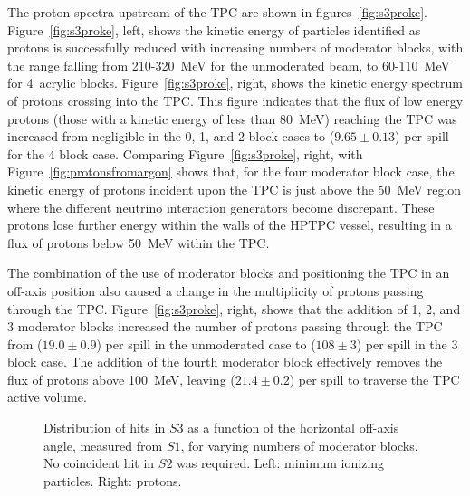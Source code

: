 The proton spectra upstream of the TPC are shown in figures~\ref{fig:s3proke}.
Figure~\ref{fig:s3proke}, left, shows the kinetic energy of particles identified as protons is successfully reduced with increasing numbers of moderator blocks, with the range falling from 210-320~MeV for the unmoderated beam, to 60-110~MeV for 4~acrylic blocks.
Figure~\ref{fig:s3proke}, right, shows the kinetic energy spectrum of protons crossing into the TPC.
This figure indicates that the flux of low energy protons (those with a kinetic energy of less than 80~MeV) reaching the TPC was increased from negligible in the 0, 1, and 2 block cases to ($9.65 \pm 0.13$) per spill for the 4 block case.
Comparing Figure~\ref{fig:s3proke}, right, with Figure~\ref{fig:protonsfromargon} shows that, for the four moderator block case, the kinetic energy of protons incident upon the TPC is just above the 50~MeV region where the different neutrino interaction generators become discrepant.
These protons lose further energy within the walls of the HPTPC vessel, resulting in a flux of protons below 50~MeV within the TPC.

The combination of the use of moderator blocks and positioning the TPC in an off-axis position also caused a change in the multiplicity of protons passing through the TPC.
Figure~\ref{fig:s3proke}, right, shows that the addition of 1, 2, and 3 moderator blocks increased the number of protons passing through the TPC from ($19.0 \pm 0.9$) per spill in the unmoderated case to ($108 \pm 3$) per spill in the 3 block case.
The addition of the fourth moderator block effectively removes the flux of protons above 100~MeV, leaving ($21.4 \pm 0.2$) per spill to traverse the TPC active volume.
  
\begin{figure}[h]
  \begin{minipage}{0.48\textwidth}
    \begin{adjustbox}{max totalsize={\textwidth}{.35\textheight},center}
      
    \end{adjustbox}
  \end{minipage}
  \hspace{0.3cm}
  \begin{minipage}{0.48\textwidth}
    \begin{adjustbox}{max totalsize={\textwidth}{.35\textheight},center}
      
    \end{adjustbox}
  \end{minipage}
    \caption{\label{fig:s1s3mips}Distribution of hits in $\mathit{S3}$ as a function of the horizontal off-axis angle, measured from $\mathit{S1}$, for varying numbers of moderator blocks. No coincident hit in $\mathit{S2}$ was required. Left: minimum ionizing particles. Right: protons.}
\end{figure}

